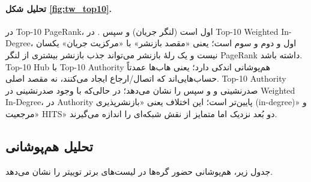\documentclass{article}
\begin{document}
\paragraph{تحلیل شکل \ref{fig:tw_top10}.}
در Top-10 PageRank،  اول است (لنگر جریان) و سپس .
در Top-10 Weighted In-Degree،  اول و  دوم و  سوم است؛ یعنی «مقصد بازنشر» با «مرکزیت جریان» یکسان نیست و یک رلهٔ بازنشر می‌تواند جذب بازنشر بیشتری از لنگر PageRank داشته باشد.
Top-10 Hub با Top-10 Authority هم‌پوشانی اندکی دارد؛ یعنی هاب‌ها عمدتاً حساب‌هایی‌اند که اتصال/ارجاع ایجاد می‌کنند، نه مقصد اصلی.
Top-10 Authority صدرنشینی  و  و سپس  را نشان می‌دهد؛ در حالی‌که  با وجود صدرنشینی در Weighted In-Degree، در Authority پایین‌تر است؛ این اختلاف یعنی «بازنشرپذیری (in-degree)» و «مرجعیت HITS» دو بُعد نزدیک اما متمایز از نقش    شبکه‌ای را اندازه می‌گیرند.
	
	
	
	
	\subsection{تحلیل هم‌پوشانی}
	جدول زیر، هم‌پوشانی حضور گره‌ها در لیست‌های برتر توییتر را نشان می‌دهد.
	
\end{document}
